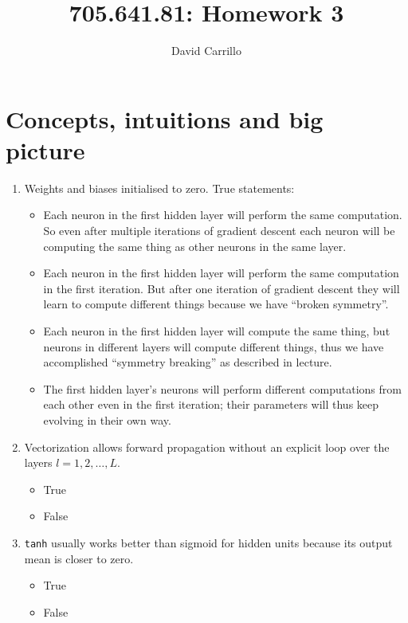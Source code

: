 \documentclass[11pt]{article}
\title{705.641.81: Homework 3}
\author{David Carrillo}
\date{}
\begin{document}
\maketitle

\section{Concepts, intuitions and big picture}

\begin{enumerate}
  \item Weights and biases initialised to zero. True statements:
        \begin{itemize}
          \item[{[X]}] Each neuron in the first hidden layer will perform the same computation. So even
                after multiple iterations of gradient descent each neuron will be computing the same thing
                as other neurons in the same layer.
          \item[{[\ ]}] Each neuron in the first hidden layer will perform the same computation in the
                first iteration. But after one iteration of gradient descent they will learn to compute
                different things because we have ``broken symmetry''.
          \item[{[\ ]}] Each neuron in the first hidden layer will compute the same thing, but neurons in
                different layers will compute different things, thus we have accomplished ``symmetry
                breaking'' as described in lecture.
          \item[{[\ ]}] The first hidden layer's neurons will perform different computations from each
                other even in the first iteration; their parameters will thus keep evolving in their own way.
        \end{itemize}

  \item Vectorization allows forward propagation without an explicit loop over the layers
        $l = 1, 2, \ldots, L$.
        \begin{itemize}
          \item[{[\ ]}] True
          \item[{[X]}] False
        \end{itemize}

  \item \texttt{tanh} usually works better than sigmoid for hidden units because its output mean is closer
        to zero.
        \begin{itemize}
          \item[{[X]}] True
          \item[{[\ ]}] False
        \end{itemize}


\end{enumerate}
\end{document}

